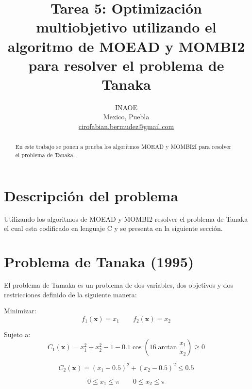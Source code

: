 \documentclass[conference]{IEEEtran}
\begin{document}
\title{Tarea 5: Optimización multiobjetivo utilizando el algoritmo de MOEAD y MOMBI2 para resolver el problema de Tanaka
}

\author{
INAOE\\
Mexico, Puebla \\
\url{cirofabian.bermudez@gmail.com}
}

\maketitle

\begin{abstract}
En este trabajo se ponen a prueba los algoritmos MOEAD y MOMBI2I para resolver el problema de  Tanaka.
\end{abstract}



\section{Descripción del problema}

Utilizando los algoritmos de MOEAD y MOMBI2 resolver el problema de Tanaka el cual esta codificado en lenguaje C y se presenta en la siguiente sección.


\section{Problema de Tanaka (1995)}
El problema de Tamaka es un problema de dos variables, dos objetivos y dos restricciones definido de la siguiente manera:

Minimizar:
\begin{equation}
f_{1}(\mathbf{x}) = x_{1} \qquad f_{2}(\mathbf{x}) = x_{2}
\end{equation}

Sujeto a:
\begin{equation}
C_{1}(\mathbf{x})  = x_{1}^{2} + x_{2}^{2} - 1 - 0.1 \cos \left(  16 \arctan \frac{x_{1}}{x_{2}}\right) \geq 0  
\end{equation}

\begin{equation}
C_{2}(\mathbf{x})  = (x_{1} -0.5)^{2} + (x_{2} -0.5)^{2}  \leq 0.5 
\end{equation}

\begin{equation}
0 \leq x_{1} \leq \pi \qquad 0 \leq x_{2} \leq \pi
\end{equation}
\end{document}
